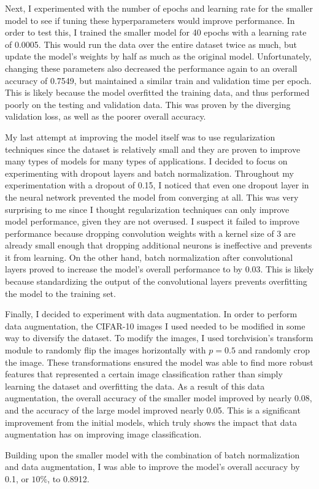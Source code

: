 \documentclass[11pt,a4paper]{article}
\begin{document}
Next, I experimented with the number of epochs and learning rate for the smaller model to see if tuning these hyperparameters 
 would improve performance. In order to test this, I trained the smaller model for 40 epochs with a learning rate of 0.0005.
  This would run the data over the entire dataset twice as much, but update the model's weights by half as much as the original 
  model. Unfortunately, changing these parameters also decreased the performance again to an overall accuracy of 0.7549, 
  but maintained a similar train and validation time per epoch. This is likely because the model overfitted the training data, 
  and thus performed poorly on the testing and validation data. This was proven by the diverging validation loss, as well as the 
  poorer overall accuracy.

My last attempt at improving the model itself was to use regularization techniques since the dataset is relatively small and
 they are proven to improve many types of models for many types of applications. I decided to focus on experimenting with dropout 
 layers and batch normalization. Throughout my experimentation with a dropout of 0.15, I noticed that even one dropout layer in 
 the neural network prevented the model from converging \italics at all. This was very surprising to me since I thought regularization 
 techniques can only improve model performance, given they are not overused. I suspect it failed to improve performance because dropping 
 convolution weights with a kernel size of 3 are already small enough that dropping additional neurons is ineffective and prevents it
  from learning. On the other hand, batch normalization after convolutional layers proved to increase the model's overall performance
  to by 0.03. This is likely because standardizing the output of the convolutional layers prevents overfitting the model to the training set.

Finally, I decided to experiment with data augmentation. In order to perform data augmentation, the CIFAR-10 images I used needed
 to be modified in some way to diversify the dataset. To modify the images, I used torchvision's transform module to randomly flip 
 the images horizontally with $p=0.5$ and randomly crop the image. These transformations ensured the model was able to find more robust 
 features that represented a certain image classification rather than simply learning the dataset and overfitting the data. As a 
 result of this data augmentation, the overall accuracy of the smaller model improved by nearly 0.08, and the accuracy of the large 
 model improved nearly 0.05. This is a significant improvement from the initial models, which truly shows the impact that data 
 augmentation has on improving image classification.

Building upon the smaller model with the combination of batch normalization and data augmentation, I was able to improve the
 model's overall accuracy by 0.1, or $10\%$, to 0.8912.


\printbibliography
\end{document}
